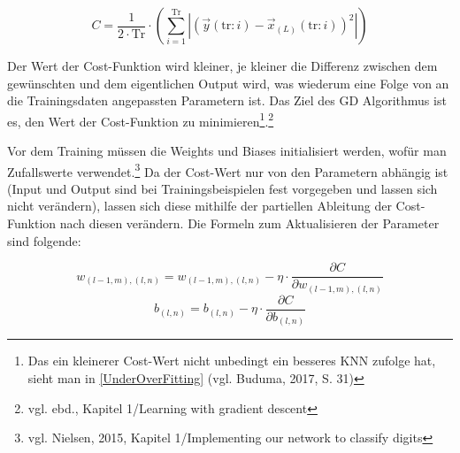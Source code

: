 \documentclass[a4paper,12pt,ngerman,oneside]{scrreprt}	%
\newcommand{\fundamentals}[1]{vgl. Buduma, 2017, S. {#1}}
\begin{document}
			\begin{equation}\label{MSE}
				C = \frac{1}{2\cdot\textrm{Tr}} \cdot \left( \sum_{i=1}^{\textrm{Tr}} |(\vec{y}(\textrm{tr}:i) - \vec{x}_{(L)}(\textrm{tr}:i))^2| \right)
			\end{equation} %
			
			Der Wert der Cost-Funktion wird kleiner, je kleiner die Differenz zwischen dem gewünschten und dem eigentlichen Output wird, was wiederum eine Folge von an die Trainingsdaten angepassten Parametern ist. Das Ziel des GD Algorithmus ist es, den Wert der Cost-Funktion zu minimieren\footnote{Das ein kleinerer Cost-Wert nicht unbedingt ein besseres KNN zufolge hat, sieht man in \ref{UnderOverFitting} (\fundamentals{31})}.\footnote{vgl. ebd., Kapitel 1/Learning with gradient descent}
			
			Vor dem Training müssen die Weights und Biases initialisiert werden, wofür man Zufallswerte verwendet.\footnote{vgl. Nielsen, 2015, Kapitel 1/Implementing our network to classify digits} 
			Da der Cost-Wert nur von den Parametern abhängig ist (Input und Output sind bei Trainingsbeispielen fest vorgegeben und lassen sich nicht verändern), lassen sich diese mithilfe der partiellen Ableitung der Cost-Funktion nach diesen verändern. Die Formeln zum Aktualisieren der Parameter sind folgende:
			
			\begin{equation}\label{UpdateRuleWeights}
				w_{(l-1,m),(l,n)} = w_{(l-1,m),(l,n)} - \eta \cdot \frac{\partial C}{\partial w_{(l-1,m),(l,n)}}
			\end{equation}
			\begin{equation}\label{UpdateRuleBiases}
				b_{(l,n)} = b_{(l,n)} - \eta \cdot \frac{\partial C}{\partial b_{(l,n)}}
			\end{equation}
			
\end{document}
